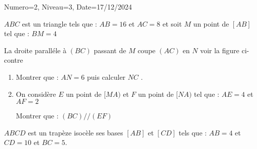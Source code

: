 \documentclass[a4paper,12pt]{article}
\begin{document}
\begin{Maquette}[DS]{Numero=2, Niveau=3, Date=17/12/2024}
\begin{exercice}
\begin{minipage}{0.4\linewidth}
\end{minipage}
\begin{minipage}{0.6\linewidth}
$ABC$ est un triangle tels que : $AB=16$ et $AC=8$ et soit  $M$ un point de  $[AB]$ tel que : $BM=4$

La droite paralléle à $(BC)$ passant de $M$ coupe  $(AC)$ en $N$ voir la figure ci-contre
\begin{enumerate}
\item Montrer que : $AN=6$ puis calculer $NC$ .
\item On considère $E$ un point de $[MA)$ et $F$ un point de $[NA)$ tel que : $AE=4$ et $AF=2$

Montrer que : $(BC)//(EF)$
\end{enumerate}
\end{minipage}%

\begin{minipage}{\linewidth}
\end{minipage}

\end{exercice}


\begin{exercice}
$ABCD$ est un trapèze isocèle ses bases $[AB]$ et $[CD]$ tels que : $AB=4$ et $CD=10$ et $BC=5$.


\end{exercice}
\end{Maquette}
\end{document}
